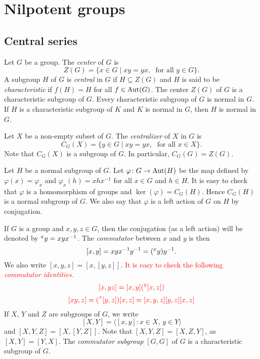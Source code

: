 \chapter{Nilpotent groups}
\label{nilpotent}


\section{Central series}

Let $G$ be a group. The {\em center} of $G$ is 
\[ Z(G)=\{ x\in G\mid xy=yx,\; \mbox{ for all } y\in G\}.\]
A subgroup $H$ of $G$ is {\em central} in $G$ if $H\subseteq Z(G)$ and 
$H$ is said to be {\em characteristic} if 
$f(H)= H$ for all $f\in\operatorname{Aut}(G)$. The center $Z(G)$ of $G$ is a characteristic subgroup of $G$. Every characteristic subgroup of $G$ is normal in $G$. 
If $H$ is a characteristic subgroup of $K$ and $K$ is normal in $G$, 
then $H$ is normal in $G$. 


 Let $X$ be a non-empty subset of $G$. The {\em centralizer} of $X$ in $G$ is
\[ C_G(X)=\{ y\in G\mid xy=yx,\;\mbox{ for all }x\in X\}.
\]
Note that $C_G(X)$ is a subgroup of $G$. In particular, $C_G(G)=Z(G)$.

Let $H$ be a normal subgroup of $G$. Let $\varphi\colon G\rightarrow \operatorname{Aut}(H)$ be the map defined by $\varphi(x)=\varphi_x$ and
$\varphi_x(h)=xhx^{-1}$ for all $x\in G$ and $h\in H$. It is easy to check that $\varphi$ is a homomorphism of groups and $\ker(\varphi)=C_G(H)$. Hence $C_G(H)$ is a normal subgroup of $G$. We also say that $\varphi$ is a left action of $G$ on $H$ by conjugation.


If $G$ is a group and $x,y,z\in G$, then the conjugation (as a left action) will be denoted
by $\prescript{x}{}y=xyx^{-1}$.  The {\em commutator} between $x$ and $y$ is then 
\[
[x,y]=xyx^{-1}y^{-1}=(\prescript{x}{}y)y^{-1}.
\]
We also write 
$[x,y,z]=[x,[y,z]]$. 
\textcolor{red}{It is easy to check the following {\em commutator identities.}}
\begin{equation}\label{eq:comident1}
\textcolor{red}{[x,yz]=[x,y](\prescript{y}{}[x,z])}    
\end{equation}
\begin{equation}\label{eq:comident2}
\textcolor{red}{[xy,z]=(\prescript{x}{}[y,z])[x,z]=[x,y,z][y,z][x,z]}    
\end{equation}
If $X$, $Y$ and $Z$ are subgroups of $G$, we write 
\[
[X,Y]=\langle [x,y]:x\in X,\,y\in Y\rangle
\]
and $[X,Y,Z]=\left[ X,[Y,Z] \right]$. Note that
$[X,Y,Z]=[X,Z,Y]$, as $[X,Y]=[Y,X]$.
The {\em commutator subgroup} $[G,G]$ of $G$ is a characteristic subgroup of $G$.

